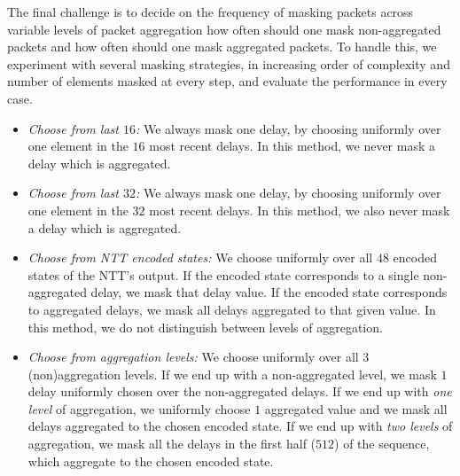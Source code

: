 The final challenge is to decide on the frequency of masking packets across variable levels of packet aggregation \ie how often should one mask non-aggregated packets and how often should one mask aggregated packets. To handle this, we experiment with several masking strategies, in increasing order of complexity and number of elements masked at every step, and evaluate the performance in every case.
\begin{itemize}
\item \emph{Choose from last $16$:} We always mask one delay, by choosing uniformly over one element in the $16$ most recent delays. In this method, we never mask a delay which is aggregated.
\item \emph{Choose from last $32$:} We always mask one delay, by choosing uniformly over one element in the $32$ most recent delays. In this method, we also never mask a delay which is aggregated.
\item \emph{Choose from NTT encoded states:} We choose uniformly over all $48$ encoded states of the NTT's output. If the encoded state corresponds to a single non-aggregated delay, we mask that delay value. If the encoded state corresponds to aggregated delays, we mask all delays aggregated to that given value. In this method, we do not distinguish between levels of aggregation.
\item \emph{Choose from aggregation levels:} We choose uniformly over all $3$ (non)aggregation levels. If we end up with a non-aggregated level, we mask $1$ delay uniformly chosen over the non-aggregated delays. If we end up with \emph{one level} of aggregation, we uniformly choose $1$ aggregated value and we mask all delays aggregated to the chosen encoded state. If we end up with \emph{two levels} of aggregation, we mask all the delays in the first half ($512$) of the sequence, which aggregate to the chosen encoded state.
\end{itemize}

